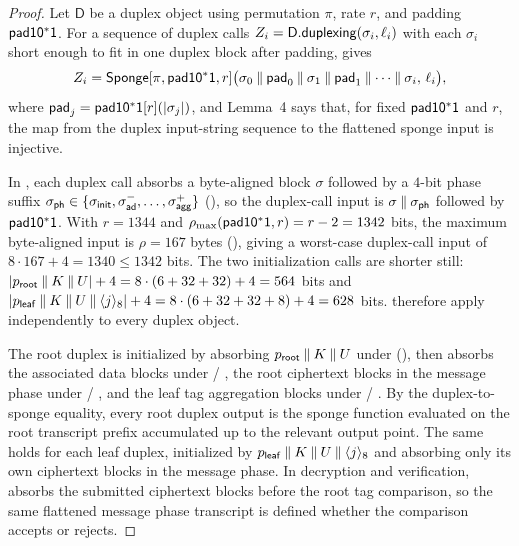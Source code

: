 \begin{proof}
Let $\mathsf{D}$ be a duplex object using permutation $\pi$, rate $r$,
and padding $\mathsf{pad10^*1}$. For a sequence of duplex calls $Z_i =
\mathsf{D}.\mathsf{duplexing}(\sigma_i, \ell_i)$ with each $\sigma_i$ short
enough to fit in one duplex block after padding, \cite[Lemma~3]{BDPV11}
gives
\[
  Z_i = \mathsf{Sponge}[\pi, \mathsf{pad10^*1}, r]
    \bigl(\sigma_0 \mathbin{\|} \mathsf{pad}_0 \mathbin{\|} \sigma_1
          \mathbin{\|} \mathsf{pad}_1 \mathbin{\|} \cdots \mathbin{\|} \sigma_i,\, \ell_i\bigr),
\]
where $\mathsf{pad}_j = \mathsf{pad10^*1}[r](|\sigma_j|)$, and Lemma~4 says
that, for fixed $\mathsf{pad10^*1}$ and $r$, the map from the duplex input-string
sequence to the flattened sponge input is injective.

In \TW{}, each duplex call absorbs a byte-aligned block $\sigma$
followed by a $4$-bit phase suffix $\sigph \in \{\siginit,
\sigadmore, \dots, \sigagglast\}$
(), so the duplex-call input is
$\sigma \concat \sigph$ followed by $\mathsf{pad10^*1}$. With
$r = 1344$ and $\rho_{\max}(\mathsf{pad10^*1}, r) = r - 2 = 1342$ bits, the
maximum byte-aligned input is $\rho = 167$ bytes
(), giving a worst-case duplex-call input of $8 \cdot
167 + 4 = 1340 \leq 1342$ bits. The two initialization calls are
shorter still: $|p_{\mathsf{root}} \mathbin{\|} K \mathbin{\|} U| + 4 = 8
\cdot (6 + 32 + 32) + 4 = 564$ bits and $|p_{\mathsf{leaf}} \mathbin{\|}
K \mathbin{\|} U \mathbin{\|} \langle j \rangle_8| + 4 = 8 \cdot (6 + 32 + 32 +
8) + 4 = 628$ bits. \cite[Lemmas~3 and~4]{BDPV11} therefore apply
independently to every \TW{} duplex object.

The root duplex is initialized by absorbing $p_{\mathsf{root}}
\mathbin{\|} K \mathbin{\|} U$ under \siginit (), then
absorbs the associated data blocks under \sigadmore /
\sigadlast, the root ciphertext blocks in the message phase under
\sigmsgmore / \sigmsglast, and the leaf tag aggregation
blocks under \sigaggmore / \sigagglast. By the
duplex-to-sponge equality, every root duplex output is the sponge
function evaluated on the root transcript prefix accumulated up to the
relevant output point. The same holds for each leaf duplex,
initialized by $p_{\mathsf{leaf}} \mathbin{\|} K \mathbin{\|} U \mathbin{\|}
\langle j \rangle_8$ and absorbing only its own ciphertext blocks in the
message phase. In decryption and verification,  absorbs the
submitted ciphertext blocks before the root tag comparison, so the same
flattened message phase transcript is defined whether the comparison
accepts or rejects.
\end{proof}


